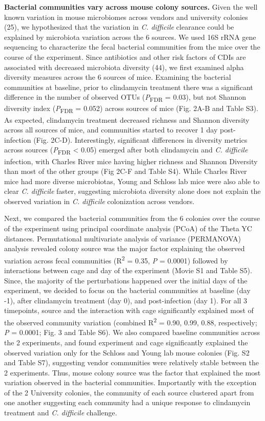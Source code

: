\documentclass[11pt,]{article}
\begin{document}
\textbf{Bacterial communities vary across mouse colony sources.} Given
the well known variation in mouse microbiomes across vendors and
university colonies (25), we hypothesized that the variation in \emph{C.
difficile} clearance could be explained by microbiota variation across
the 6 sources. We used 16S rRNA gene sequencing to characterize the
fecal bacterial communities from the mice over the course of the
experiment. Since antibiotics and other risk factors of CDIs are
associated with decreased microbiota diversity (44), we first examined
alpha diversity measures across the 6 sources of mice. Examining the
bacterial communities at baseline, prior to clindamycin treatment there
was a significant difference in the number of observed OTUs
(\emph{P}\textsubscript{FDR} = 0.03), but not Shannon diversity index
(\emph{P}\textsubscript{FDR} = 0.052) across sources of mice (Fig. 2A-B
and Table S3). As expected, clindamycin treatment decreased richness and
Shannon diversity across all sources of mice, and communities started to
recover 1 day post-infection (Fig. 2C-D). Interestingly, significant
differences in diversity metrics across sources
(\emph{P}\textsubscript{FDR} \textless{} 0.05) emerged after both
clindamycin and \emph{C. difficile} infection, with Charles River mice
having higher richness and Shannon Diversity than most of the other
groups (Fig 2C-F and Table S4). While Charles River mice had more
diverse microbiotas, Young and Schloss lab mice were also able to clear
\emph{C. difficile} faster, suggesting microbiota diversity alone does
not explain the observed variation in \emph{C. difficile} colonization
across vendors.

Next, we compared the bacterial communities from the 6 colonies over the
course of the experiment using principal coordinate analysis (PCoA) of
the Theta YC distances. Permutational multivariate analysis of variance
(PERMANOVA) analysis revealed colony source was the major factor
explaining the observed variation across fecal communities
(R\textsuperscript{2} = 0.35, \emph{P} = 0.0001) followed by
interactions between cage and day of the experiment (Movie S1 and Table
S5). Since, the majority of the perturbations happened over the initial
days of the experiment, we decided to focus on the bacterial communities
at baseline (day -1), after clindamycin treatment (day 0), and
post-infection (day 1). For all 3 timepoints, source and the interaction
with cage significantly explained most of the observed community
variation (combined R\textsuperscript{2} = 0.90, 0.99, 0.88,
respectively; \emph{P} = 0.0001; Fig. 3 and Table S6). We also compared
baseline communities across the 2 experiments, and found experiment and
cage significantly explained the observed variation only for the Schloss
and Young lab mouse colonies (Fig. S2 and Table S7), suggesting vendor
communities were relatively stable between the 2 experiments. Thus,
mouse colony source was the factor that explained the most variation
observed in the bacterial communities. Importantly with the exception of
the 2 University colonies, the community of each source clustered apart
from one another suggesting each community had a unique response to
clindamycin treatment and \emph{C. difficile} challenge.
\end{document}
